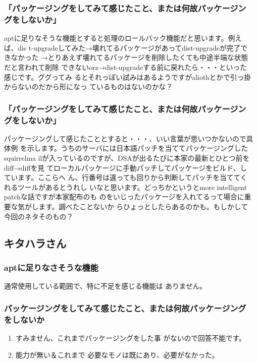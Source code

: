 \documentclass[mingoth,a4paper]{jsarticle}
\begin{document}
\subsubsection*{「パッケージングをしてみて感じたこと、または何故パッケージングをしないか」}

aptに足りなそうな機能とすると処理のロールバック機能だと思います。例えば、dis
t-upgradeしてみた→壊れてるパッケージがあってdist-upgradeが完了できなかった
→とりあえず壊れてるパッケージを削除したくても中途半端な状態だと言われて削除
できないorz→dist-upgradeする前に戻れたら・・・といった感じです。ググってみ
るとそれっぽい試みはあるようですがaliothとかで引っ掛からないのだから形になっ
ているものはないのかな？

\subsubsection*{「パッケージングをしてみて感じたこと、または何故パッケージングをしないか」}

パッケージングして感じたこととすると・・・、いい言葉が思いつかないので具体例
を示します。うちのサーバには日本語パッチを当ててパッケージングしたsquirrelma
ilが入っているのですが、DSAが出るたびに本家の最新とひとつ前をdiff→diffを見
てローカルパッケージに手動パッチしてパッケージをビルド、しています。ここらへ
ん、行番号は違っても回りから判断してパッチを当ててくれるツールがあるとうれし
いなと思います。どっちかというとmore intelligent patchな話ですが本家配布のも
のをいじったパッケージを入れてるって場合に重要な気がします。調べたことないか
らひょっとしたらあるのかも。もしかして今回のネタそのもの？

\subsection{キタハラさん}

\subsubsection*{aptに足りなさそうな機能}

通常使用している範囲で、特に不足を感じる機能は
ありません。

\subsubsection*{パッケージングをしてみて感じたこと、または何故パッケージングをしないか}


\begin{enumerate}
 \item  すみません、これまでパッケージングをした事
 がないので回答不能です。　

 \item  能力が無い＆これまで
 必要なモノは既にあり、必要がなかった。
\end{enumerate}
\end{document}
